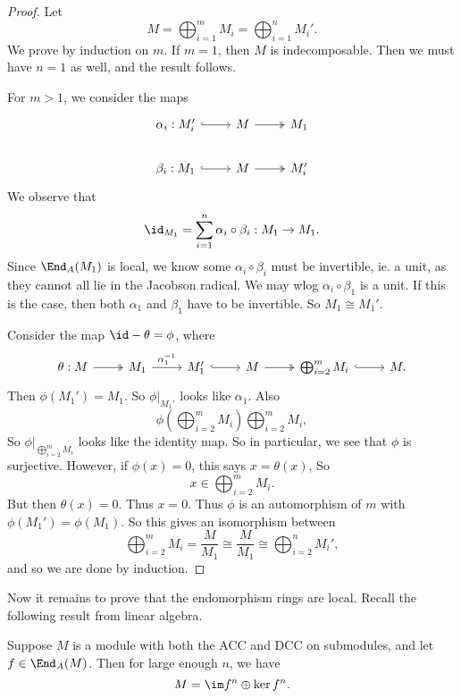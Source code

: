 \documentclass[a4paper]{article}
\begin{document}
\begin{proof} %
  Let
  \[
    M = \bigoplus_{i = 1}^m M_i = \bigoplus_{i = 1}^n M_i'.
  \]
  We prove by induction on $m$. If $m = 1$, then $M$ is indecomposable. Then we must have $n = 1$ as well, and the result follows.

  For $m > 1$, we consider the maps
  \[
    \begin{tikzcd}
      \alpha_i: M_i' \ar[r, hook] & M \ar[r, two heads] & M_1\\
      \beta_i: M_1 \ar[r, hook] & M \ar[r, two heads] & M_i'
    \end{tikzcd}
  \]
  We observe that
  \[
    \id_{M_1} = \sum_{i = 1}^n \alpha_i \circ \beta_i: M_1 \to M_1.
  \]
  Since $\End_A(M_1)$ is local, we know some $\alpha_i \circ \beta_i$ must be invertible, ie. a unit, as they cannot all lie in the Jacobson radical. We may wlog $\alpha_i \circ \beta_1$ is a unit. If this is the case, then both $\alpha_1$ and $\beta_1$ have to be invertible. So $M_1 \cong M_1'$. %

  Consider the map $\id - \theta = \phi$, where
  \[
    \begin{tikzcd}
      \theta: M \ar[r, two heads] & M_1 \ar[r, "\alpha_1^{-1}"] & M_1' \ar[r, hook] & M \ar[r, two heads] & \bigoplus_{i = 2}^m M_i \ar[r, hook] & M.
    \end{tikzcd}
  \]
  Then $\phi(M_1') = M_1$. So $\phi|_{M_1'}$ looks like $\alpha_1$. Also
  \[
    \phi\left(\bigoplus_{i = 2}^m M_i\right) \bigoplus_{i = 2}^m M_i,
  \]
  So $\phi|_{\bigoplus_{i = 2}^m M_i}$ looks like the identity map. So in particular, we see that $\phi$ is surjective. However, if $\phi(x) = 0$, this says $x = \theta(x)$, So
  \[
    x \in \bigoplus_{i = 2}^m M_i.
  \]
  But then $\theta(x) = 0$. Thus $x = 0$. Thus $\phi$ is an automorphism of $m$ with $\phi(M_1') = \phi(M_1)$. So this gives an isomorphism between
  \[
    \bigoplus_{i = 2}^m M_i = \frac{M}{M_1} \cong \frac{M}{M_1} \cong \bigoplus_{i = 2}^n M_i',
  \]
  and so we are done by induction.
\end{proof}

Now it remains to prove that the endomorphism rings are local. Recall the following result from linear algebra.
\begin{lemma}[Fitting]
  Suppose $M$ is a module with both the ACC and DCC on submodules, and let $f \in \End_A(M)$. Then for large enough $n$, we have
  \[
    M = \im f^n \oplus \ker f^n.
  \]
\end{lemma}
\end{document}
